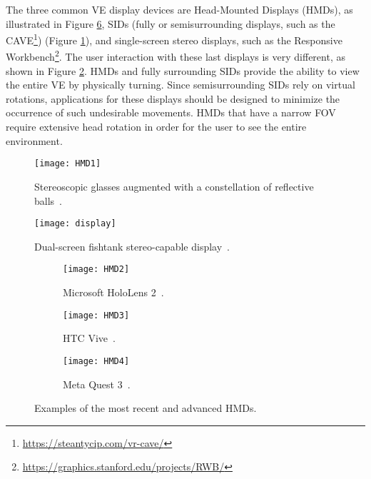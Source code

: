 The three common \gls{VE} display devices are Head-Mounted Displays (\glspl{HMD}), as illustrated in Figure \ref{fig:HMDs}, \glspl{SID} (fully or 
semisurrounding displays, such as the \gls{CAVE}\footnote{\url{https://steantycip.com/vr-cave/}}) (Figure \ref{fig:HMD1}), and single-screen stereo displays, such as the Responsive Workbench\footnote{\url{https://graphics.stanford.edu/projects/RWB/}}. 
The user interaction with these last displays is very different, as shown in Figure \ref{fig:display}. \glspl{HMD} and fully surrounding \glspl{SID} provide the ability to view the entire \gls{VE} by physically turning. 
Since semisurrounding \glspl{SID} rely on virtual rotations, applications for these displays should be designed to minimize the occurrence of such undesirable movements. 
\glspl{HMD} that have a narrow \gls{FOV} require extensive head rotation in order for the user to see the entire environment. 


\begin{figure}[h!]
    \centering
    \texttt{[image: HMD1]}
    \caption{Stereoscopic glasses augmented with a constellation of reflective balls~\cite{SHERMAN2019258}.} 
    \label{fig:HMD1}
\end{figure}

\begin{figure}[h!]
    \centering
    \texttt{[image: display]}
    \caption{Dual-screen fishtank stereo-capable display~\cite{SHERMAN2019258}.} 
    \label{fig:display}
\end{figure}

\begin{figure}[h!]
    \centering
    \begin{subfigure}[b]{0.35\textwidth}
        \centering
        \texttt{[image: HMD2]}
        \caption{Microsoft HoloLens 2~\cite{headset_article}.}
        \label{fig:HM}
    \end{subfigure}
    \begin{subfigure}[b]{0.35\textwidth}
        \centering
        \texttt{[image: HMD3]}
        \caption{HTC Vive~\cite{SHERMAN2019258}.}
        \label{fig:y1}
    \end{subfigure}
    \hfill
    \begin{subfigure}[b]{0.35\textwidth}
        \centering
        \texttt{[image: HMD4]}
        \caption{Meta Quest 3~\cite{article}.}
        \label{fig:y2}
    \end{subfigure}
    \caption{Examples of the most recent and advanced \glspl{HMD}.}
    \label{fig:HMDs}
\end{figure}

